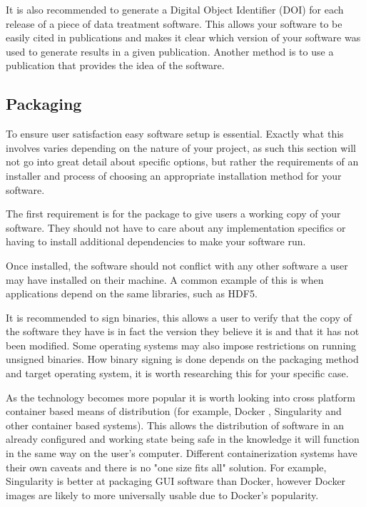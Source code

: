 \documentclass[jnr]{iosart2x}
\begin{document}
It is also recommended to generate a Digital Object Identifier (DOI) for each release of a piece of data treatment software.
This allows your software to be easily cited in publications and makes it clear which version of your software was used to generate results in a given publication.
Another method is to use a publication that provides the idea of the software.

\subsection{Packaging}
\label{Packaging}

To ensure user satisfaction easy software setup is essential.
Exactly what this involves varies depending on the nature of your project, as such this section will not go into great detail about specific options, but rather the requirements of an installer and process of choosing an appropriate installation method for your software.

The first requirement is for the package to give users a working copy of your software.
They should not have to care about any implementation specifics or having to install additional dependencies to make your software run.

Once installed, the software should not conflict with any other software a user may have installed on their machine.
A common example of this is when applications depend on the same libraries, such as HDF5.

It is recommended to sign binaries, this allows a user to verify that the copy of the software they have is in fact the version they believe it is and that it has not been modified.
Some operating systems may also impose restrictions on running unsigned binaries.
How binary signing is done depends on the packaging method and target operating system, it is worth researching this for your specific case.

As the technology becomes more popular it is worth looking into cross platform container based means of distribution (for example, Docker \cite{Docker}, Singularity \cite{Kurtzer_2017} and other container based systems).
This allows the distribution of software in an already configured and working state being safe in the knowledge it will function in the same way on the user's computer.
Different containerization systems have their own caveats and there is no "one size fits all" solution.
For example, Singularity is better at packaging GUI software than Docker, however Docker images are likely to more universally usable due to Docker's popularity.
\end{document}
